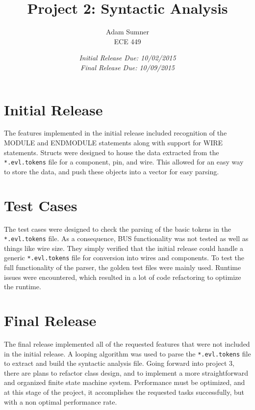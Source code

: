 \documentclass[12pt]{article}
\title{\textbf{Project 2: Syntactic Analysis}}
\author{Adam Sumner\\ECE 449}
\date{\textit{Initial Release Due: 10/02/2015}\\ \textit{Final Release Due: 10/09/2015}}
\begin{document}
\maketitle

\section{Initial Release}
The features implemented in the initial release included recognition of the MODULE and ENDMODULE statements along with support for WIRE statements. Structs were designed to house the data extracted from the \texttt{*.evl.tokens} file for  a component, pin, and wire. This allowed for an easy way to store the data, and push these objects into a vector for easy parsing.


\section{Test Cases}
The test cases were designed to check the parsing of the basic tokens in the \texttt{*.evl.tokens} file. As a consequence, BUS functionality was not tested as well as things like wire size. They simply verified that the initial release could handle a generic \texttt{*.evl.tokens} file for conversion into wires and components. To test the full functionality of the parser, the golden test files were mainly used. Runtime issues were encountered, which resulted in a lot of code refactoring to optimize the runtime.
\section{Final Release}
The final release implemented all of the requested features that were not included in the initial release. A looping algorithm was used to parse the \texttt{*.evl.tokens} file to extract and build the syntactic analysis file. Going forward into project 3, there are plans to refactor class design, and to implement a more straightforward and organized finite state machine system. Performance must be optimized, and at this stage of the project, it accomplishes the requested tasks successfully, but with a non optimal performance rate.
\end{document}
